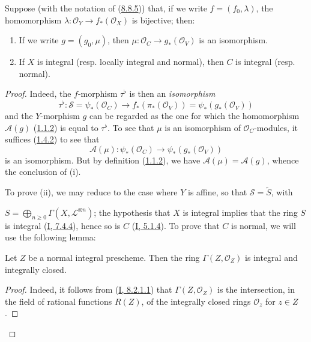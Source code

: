 \begin{proposition}[8.8.6]
\label{II.8.8.6}
Suppose (with the notation of (\hyperref[II.8.8.5]{8.8.5})) that, if we
write $f=(f_0,\lambda)$, the homomorphism
$\lambda:\mathcal{O}_Y\to f_*(\mathcal{O}_X)$ is bijective; then:
\begin{enumerate}
  \item[\rm{(i)}] If we write $g=(g_0,\mu)$, then
  $\mu:\mathcal{O}_C\to g_*(\mathcal{O}_V)$ is an isomorphism.
  \item[\rm{(ii)}] If $X$ is integral (resp. locally integral and normal),
  then $C$ is integral (resp. normal).
\end{enumerate}
\end{proposition}

\begin{proof}
Indeed, the $f$-morphism $\tau^\flat$ is then an \emph{isomorphism}
\[
  \tau^\flat:\mathcal{S}=\psi_*(\mathcal{O}_C)
  \longrightarrow f_*(\pi_*(\mathcal{O}_V))
  =\psi_*(g_*(\mathcal{O}_V))
\]
and the $Y$-morphism $g$ can be regarded as the one for which the
homomorphism $\mathcal{A}(g)$
(\hyperref[II.1.1.2]{1.1.2}) is equal to $\tau^\flat$. To see that
$\mu$ is an isomorphism of $\mathcal{O}_C$-modules, it suffices
(\hyperref[II.1.4.2]{1.4.2}) to see that
\[
  \mathcal{A}(\mu):\psi_*(\mathcal{O}_C)
  \longrightarrow\psi_*(g_*(\mathcal{O}_V))
\]
is an isomorphism. But by definition
(\hyperref[II.1.1.2]{1.1.2}), we have
$\mathcal{A}(\mu)=\mathcal{A}(g)$, whence the conclusion of (i).

To prove (ii), we may reduce to the case where $Y$ is affine, so that
$\mathcal{S}=\widetilde{S}$, with

$S=\bigoplus_{n\geqslant 0}\Gamma(X,\mathcal{L}^{\otimes n})$;
the hypothesis that $X$ is integral implies that the ring $S$ is integral
(\hyperref[I.7.4.4]{I, 7.4.4}), hence so is $C$
(\hyperref[I.5.1.4]{I, 5.1.4}). To prove that $C$ is normal, we
will use the following lemma:

\begin{lemma}[8.8.6.1]
\label{II.8.8.6.1}
Let $Z$ be a normal integral prescheme. Then the ring
$\Gamma(Z,\mathcal{O}_Z)$ is integral and integrally closed.
\end{lemma}

\begin{proof}
Indeed, it follows from
(\hyperref[I.8.2.1.1]{I, 8.2.1.1}) that
$\Gamma(Z,\mathcal{O}_Z)$ is the intersection, in the field of rational
functions $R(Z)$, of the integrally closed rings $\mathcal{O}_z$ for
$z\in Z$.
\end{proof}


\end{proof}
